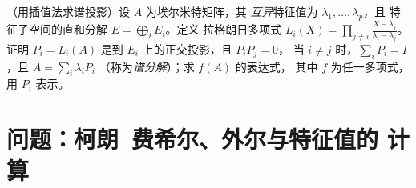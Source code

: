 \begin{exercise}[$\star\star\star$]\label{exo:b2:hermitian:12}
（用插值法求谱投影）设 $A$ 为埃尔米特矩阵，其
\emph{互异}特征值为 $\lambda_1, \dots, \lambda_p$，且
特征子空间的直和分解 $E = \bigoplus_i E_i$。定义
拉格朗日多项式 $L_i(X) = \prod_{j\neq i}\frac{X -
\lambda_j}{\lambda_i - \lambda_j}$。证明 $P_i = L_i(A)$
是到 $E_i$ 上的正交投影，且 $P_iP_j = 0$，
当 $i \neq j$ 时，$\sum_i P_i = I$，且 $A = \sum_i \lambda_iP_i$
（称为\emph{谱分解}）；求 $f(A)$ 的表达式，
其中 $f$ 为任一多项式，用 $P_i$ 表示。
\end{exercise}

\section{问题：柯朗–费希尔、外尔与特征值的
计算}

